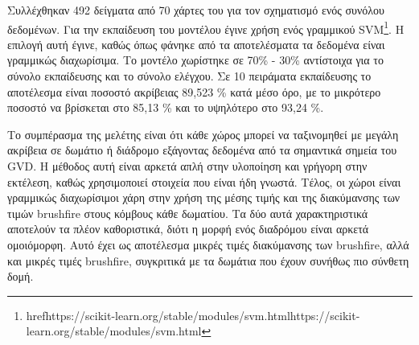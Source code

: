 Συλλέχθηκαν 492 δείγματα από 70 χάρτες του \cite{li2019houseexpo} για τον σχηματισμό ενός συνόλου δεδομένων. Για την εκπαίδευση του μοντέλου έγινε χρήση ενός γραμμικού SVM\footnote{href{https://scikit-learn.org/stable/modules/svm.html}{https://scikit-learn.org/stable/modules/svm.html}}. Η επιλογή αυτή έγινε, καθώς όπως φάνηκε από τα αποτελέσματα τα δεδομένα είναι γραμμικώς διαχωρίσιμα. Το μοντέλο χωρίστηκε σε 70\% - 30\% αντίστοιχα για το σύνολο εκπαίδευσης και το σύνολο ελέγχου. Σε 10 πειράματα εκπαίδευσης το αποτέλεσμα είναι ποσοστό ακρίβειας 89,523 \% κατά μέσο όρο, με το μικρότερο ποσοστό να βρίσκεται στο 85,13 \% και το υψηλότερο στο 93,24 \%.

Το συμπέρασμα της μελέτης είναι ότι κάθε χώρος μπορεί να ταξινομηθεί με μεγάλη ακρίβεια σε δωμάτιο ή διάδρομο εξάγοντας δεδομένα από τα σημαντικά σημεία του GVD. Η μέθοδος αυτή είναι αρκετά απλή στην υλοποίηση και γρήγορη στην εκτέλεση, καθώς χρησιμοποιεί στοιχεία που είναι ήδη γνωστά. Τέλος, οι χώροι είναι γραμμικώς διαχωρίσιμοι χάρη στην χρήση της μέσης τιμής και της διακύμανσης των τιμών brushfire στους κόμβους κάθε δωματίου. Τα δύο αυτά χαρακτηριστικά αποτελούν τα πλέον καθοριστικά, διότι η μορφή ενός διαδρόμου είναι αρκετά ομοιόμορφη. Αυτό έχει ως αποτέλεσμα μικρές τιμές διακύμανσης των brushfire, αλλά και μικρές τιμές brushfire, συγκριτικά με τα δωμάτια που έχουν συνήθως πιο σύνθετη δομή.

